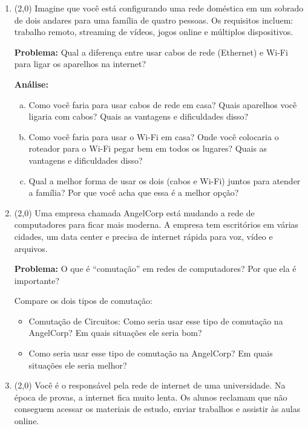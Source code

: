 \documentclass[a4paper,11pt]{modelo/prova}
\begin{document}
\maketitle

\begin{enumerate}
   \item (2,0) Imagine que você está configurando uma rede doméstica em um sobrado de dois andares para uma família de quatro pessoas. Os requisitos incluem: trabalho remoto, streaming de vídeos, jogos online e múltiplos dispositivos.

   \textbf{Problema:} Qual a diferença entre usar cabos de rede (Ethernet) e Wi-Fi para ligar os aparelhos na internet?
   
   \textbf{Análise:}
   \begin{enumerate}[a)]
      \item Como você faria para usar cabos de rede em casa? Quais aparelhos você ligaria com cabos? Quais as vantagens e dificuldades disso?
      \item Como você faria para usar o Wi-Fi em casa? Onde você colocaria o roteador para o Wi-Fi pegar bem em todos os lugares? Quais as vantagens e dificuldades disso?
      \item Qual a melhor forma de usar os dois (cabos e Wi-Fi) juntos para atender a família? Por que você acha que essa é a melhor opção?
   \end{enumerate}

   \item (2,0) Uma empresa chamada AngelCorp está mudando a rede de computadores para ficar mais moderna. A empresa tem escritórios em várias cidades, um data center e precisa de internet rápida para voz, vídeo e arquivos.

   \textbf{Problema:} O que é ``comutação'' em redes de computadores? Por que ela é importante?

   Compare os dois tipos de comutação:
   \begin{itemize}
      \item Comutação de Circuitos: Como seria usar esse tipo de comutação na AngelCorp? Em quais situações ele seria bom?
      \item Como seria usar esse tipo de comutação na AngelCorp? Em quais situações ele seria melhor?
   \end{itemize}

   \item (2,0) Você é o responsável pela rede de internet de uma universidade. Na época de provas, a internet fica muito lenta. Os alunos reclamam que não conseguem acessar os materiais de estudo, enviar trabalhos e assistir às aulas online.


\end{enumerate}
\end{document}
